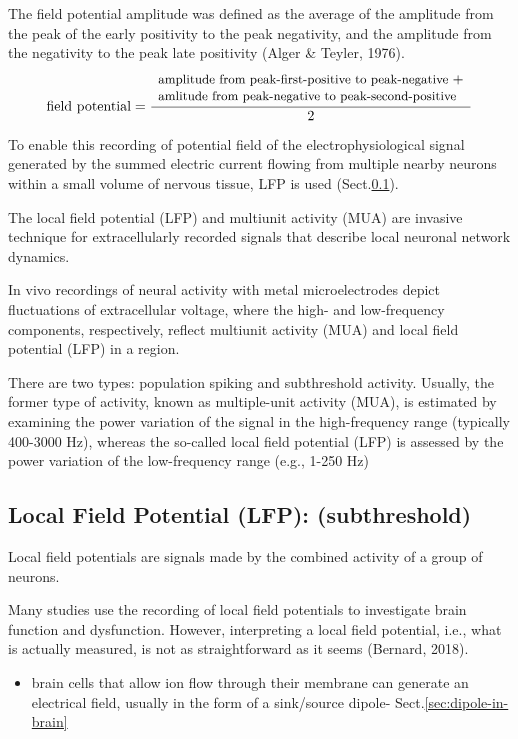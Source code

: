 The field potential amplitude was defined as the average of the amplitude from
the peak of the early positivity to the peak negativity, and the amplitude from
the negativity to the peak late positivity (Alger \& Teyler, 1976).
\begin{equation}
\text{field potential} = \frac{
\begin{array}{l}
\text{\small{amplitude from peak-first-positive to
peak-negative} }   + \\
\text{\small{amlitude from peak-negative to
peak-second-positive}}
\end{array}
}{2}
\end{equation}

To enable this recording of potential field of the electrophysiological signal
generated by the summed electric current flowing from multiple nearby neurons
within a small volume of nervous tissue, LFP is used (Sect.\ref{sec:LFP}).

The local field potential (LFP) and multiunit activity (MUA) are
invasive technique for extracellularly recorded signals that describe local
neuronal network dynamics.

In vivo recordings of neural activity with metal microelectrodes
depict fluctuations of extracellular voltage, where the high- and
low-frequency components, respectively, reflect multiunit activity
(MUA) and local field potential (LFP) in a region.

There are two types: population spiking and subthreshold activity. Usually, the
former type of activity, known as multiple-unit activity (MUA), is estimated by
examining the power variation of the signal in the high-frequency range
(typically 400-3000 Hz), whereas the so-called local field potential (LFP) is
assessed by the power variation of the low-frequency range (e.g., 1-250 Hz)


\subsection{Local Field Potential (LFP): (subthreshold)}
\label{sec:LFP}
\label{sec:local-field-potential}

Local field potentials are signals made by the combined activity of a group of neurons.


Many studies use the recording of local field potentials to investigate brain
function and dysfunction. However, interpreting a local field potential, i.e.,
what is actually measured, is not as straightforward as it seems (Bernard,
2018).
\begin{itemize}
  \item  brain cells that allow ion flow through their membrane can generate an
  electrical field, usually in the form of a sink/source dipole-
  Sect.\ref{sec:dipole-in-brain}
\end{itemize}



